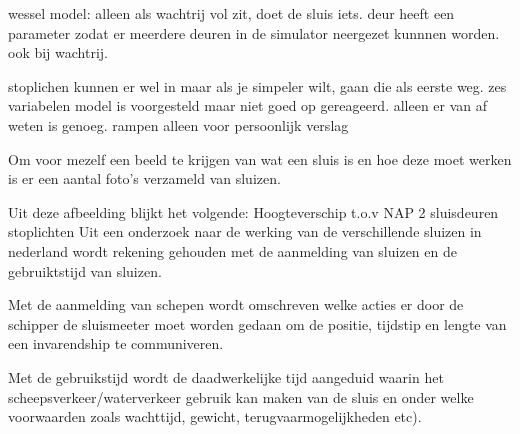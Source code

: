 wessel model: alleen als wachtrij vol zit, doet de sluis iets.
deur heeft een parameter zodat er meerdere deuren in de simulator neergezet kunnnen worden. ook bij wachtrij.

stoplichen kunnen er wel in maar als je simpeler wilt, gaan die als eerste weg.
zes variabelen model is voorgesteld maar niet goed op gereageerd. alleen er van af weten is genoeg.
rampen alleen voor persoonlijk verslag



Om voor mezelf een beeld te krijgen van wat een sluis is en hoe deze moet werken is er een aantal foto's verzameld van sluizen.	



Uit deze afbeelding blijkt het volgende:
Hoogteverschip t.o.v NAP
2 sluisdeuren
stoplichten
Uit een onderzoek naar de werking van de verschillende sluizen in nederland wordt rekening gehouden met de aanmelding van sluizen en de gebruiktstijd van sluizen.

Met de aanmelding van schepen wordt omschreven welke acties er door de schipper de sluismeeter moet worden gedaan om de positie, tijdstip en lengte van een invarendship te communiveren.

Met de gebruikstijd wordt  de daadwerkelijke tijd aangeduid waarin het scheepsverkeer/waterverkeer gebruik kan maken van de sluis en onder welke voorwaarden zoals wachttijd, gewicht, terugvaarmogelijkheden etc).

